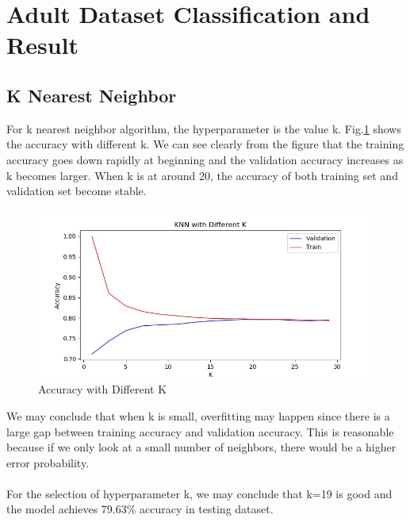 \documentclass[11pt]{article}
\begin{document}
\section{Adult Dataset Classification and Result}
\subsection{K Nearest Neighbor}
For k nearest neighbor algorithm, the hyperparameter is the value k. Fig.\ref{fig:adult_knn} shows the accuracy with different k. We can see clearly from the figure that the training accuracy goes down rapidly at beginning and the validation accuracy increases as k becomes larger. When k is at around 20, the accuracy of both training set and validation set become stable. 
\begin{figure}[h!]
  \includegraphics[width=\linewidth]{./adult/knn_k.jpg}
  \caption{Accuracy with Different K}
  \label{fig:adult_knn}
\end{figure}
We may conclude that when k is small, overfitting may happen since there is a large gap between training accuracy and validation accuracy. This is reasonable because if we only look at a small number of neighbors, there would be a higher error probability.\\
\\
For the selection of hyperparameter k, we may conclude that k=19 is good and the model achieves 79.63\% accuracy in testing dataset.
\end{document}
